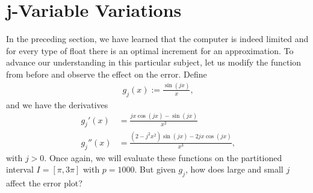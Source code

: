 \section{j-Variable Variations}

In the preceding section, we have learned that the computer is indeed limited and for every type of float there is an optimal increment for an approximation. To advance our understanding in this particular subject, let us modify the function from before and observe the effect on the error. Define
\begin{align*}
    g_j(x) := \frac{\sin(j x)}{x} \text{,}
\end{align*}
and we have the derivatives
\begin{align*}
    g_j'(x) &= \frac{j x \cos(jx) - \sin(jx)}{x^2} \\
    g_j''(x) &= \frac{(2 - j^2 x^2)\sin(jx) - 2 j x \cos(jx)}{x^3} \text{,}
\end{align*}
with \(j > 0\). Once again, we will evaluate these functions on the partitioned interval \(I = [\pi, 3\pi]\) with \(p = 1000\). But given \(g_j\), how does large and small \(j\) affect the error plot?